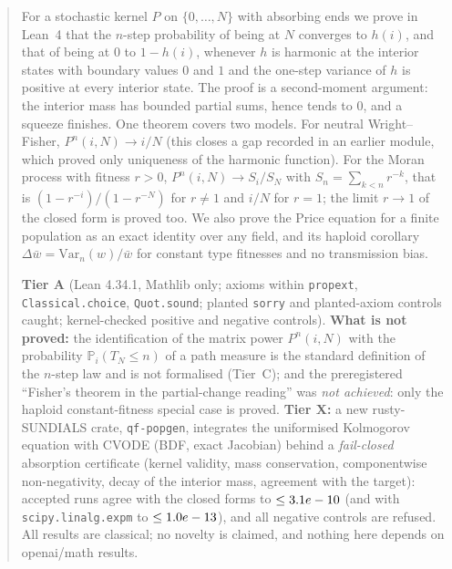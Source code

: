 \documentclass[11pt]{article}
\theoremstyle{remark}
\newcommand{\lean}[1]{\texttt{#1}}
\newcommand{\Pn}{P^{n}}
\begin{document}
\begin{abstract}
For a stochastic kernel $P$ on $\{0,\dots,N\}$ with absorbing ends we prove in Lean~4 that the $n$-step probability of
being at $N$ converges to $h(i)$, and that of being at $0$ to $1-h(i)$, whenever $h$ is harmonic at the interior states
with boundary values $0$ and $1$ and the one-step variance of $h$ is positive at every interior state. The proof is a
second-moment argument: the interior mass has bounded partial sums, hence tends to $0$, and a squeeze finishes. One
theorem covers two models. For neutral Wright--Fisher, $\Pn(i,N)\to i/N$ (this closes a gap recorded in an earlier
module, which proved only uniqueness of the harmonic function). For the Moran process with fitness $r>0$,
$\Pn(i,N)\to S_i/S_N$ with $S_n=\sum_{k<n}r^{-k}$, that is $(1-r^{-i})/(1-r^{-N})$ for $r\ne1$ and $i/N$ for $r=1$;
the limit $r\to1$ of the closed form is proved too. We also prove the Price equation for a finite population as an
exact identity over any field, and its haploid corollary $\Delta\bar w=\mathrm{Var}_n(w)/\bar w$ for constant type
fitnesses and no transmission bias.

\textbf{Tier A} (Lean 4.34.1, Mathlib only; axioms within \lean{propext}, \lean{Classical.choice}, \lean{Quot.sound};
planted \lean{sorry} and planted-axiom controls caught; kernel-checked positive and negative controls). \textbf{What is
not proved:} the identification of the matrix power $\Pn(i,N)$ with the probability $\mathbb P_i(T_N\le n)$ of a path
measure is the standard definition of the $n$-step law and is not formalised (Tier~C); and the preregistered
``Fisher's theorem in the partial-change reading'' was \emph{not achieved}: only the haploid constant-fitness special case is
proved. \textbf{Tier X:} a new rusty-SUNDIALS crate, \lean{qf-popgen}, integrates the uniformised Kolmogorov equation with
CVODE (BDF, exact Jacobian) behind a \emph{fail-closed} absorption certificate (kernel validity, mass conservation,
componentwise non-negativity, decay of the interior mass, agreement with the target): \nAcc{} accepted runs agree with the closed
forms to $\le\maxErr$ (and with \texttt{scipy.linalg.expm} to $\le\expmDiff$), and all \nRef{} negative controls are
refused. All results are classical; no novelty is claimed, and nothing here depends on openai/math results.
\end{abstract}
\end{document}
